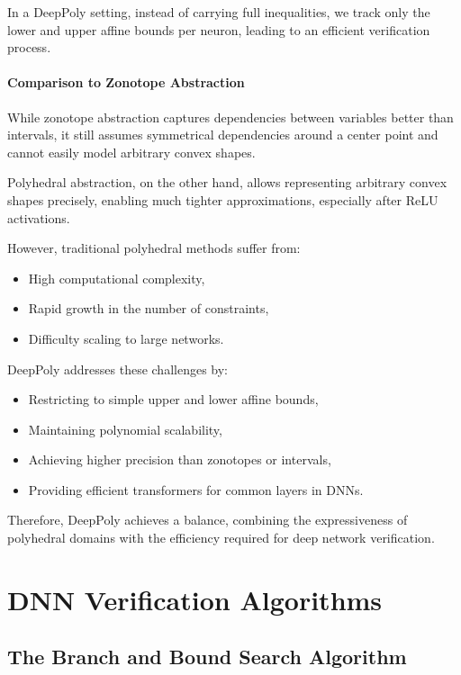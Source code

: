 \documentclass[oneside,11pt,dvipsnames]{book}
\numberwithin{equation}{section}
\theoremstyle{definition}
\theoremstyle{remark}
\begin{document}
In a DeepPoly setting, instead of carrying full inequalities, we track only the lower and upper affine bounds per neuron, leading to an efficient verification process.

\subsection{Comparison to Zonotope Abstraction}

While zonotope abstraction captures dependencies between variables better than intervals, it still assumes symmetrical dependencies around a center point and cannot easily model arbitrary convex shapes.

Polyhedral abstraction, on the other hand, allows representing arbitrary convex shapes precisely, enabling much tighter approximations, especially after ReLU activations.

However, traditional polyhedral methods suffer from:
\begin{itemize}
    \item High computational complexity,
    \item Rapid growth in the number of constraints,
    \item Difficulty scaling to large networks.
\end{itemize}

DeepPoly addresses these challenges by:
\begin{itemize}
    \item Restricting to simple upper and lower affine bounds,
    \item Maintaining polynomial scalability,
    \item Achieving higher precision than zonotopes or intervals,
    \item Providing efficient transformers for common layers in DNNs.
\end{itemize}

Therefore, DeepPoly achieves a balance, combining the expressiveness of polyhedral domains with the efficiency required for deep network verification.




\part{DNN Verification Algorithms}
\chapter{The Branch and Bound Search Algorithm}\label{chap:bab}
\end{document}
